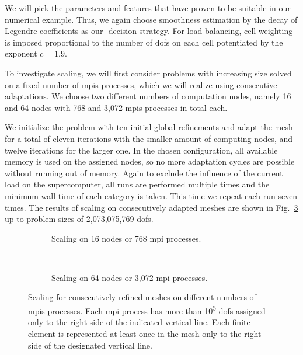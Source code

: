 We will pick the parameters and features that have proven to be suitable in our numerical example. Thus, we again choose smoothness estimation by the decay of Legendre coefficients as our \hp-decision strategy. For load balancing, cell weighting is imposed proportional to the number of \glspl{dof} on each cell potentiated by the exponent $c = 1.9$.



To investigate scaling, we will first consider problems with increasing size solved on a fixed number of \glspl{mpi} processes, which we will realize using consecutive adaptations. We choose two different numbers of computation nodes, namely 16 and 64 nodes with 768 and 3,072 \glspl{mpi} processes in total each.

We initialize the problem with ten initial global refinements and adapt the mesh for a total of eleven iterations with the smaller amount of computing nodes, and twelve iterations for the larger one. In the chosen configuration, all available memory is used on the assigned nodes, so no more adaptation cycles are possible without running out of memory. Again to exclude the influence of the current load on the supercomputer, all runs are performed multiple times and the minimum wall time of each category is taken. This time we repeat each run seven times. The results of scaling on consecutively adapted meshes are shown in Fig.~\ref{fig:size} up to problem sizes of 2,073,075,769 \glspl{dof}.

\begin{figure}
\begin{subfigure}{1\textwidth}
  \centering
  
  \caption{Scaling on 16 nodes or 768 \gls{mpi} processes.}
  \label{fig:size-nodes16}
\end{subfigure} \\
\vspace{1em}
\begin{subfigure}{1\textwidth}
  \centering
  
  \caption{Scaling on 64 nodes or 3,072 \gls{mpi} processes.}
  \label{fig:size-nodes64}
\end{subfigure}
\vspace{-1em}
\caption[Scaling for consecutively refined meshes on different numbers of  processes.]{Scaling for consecutively refined meshes on different numbers of \glspl{mpi} processes. Each \gls{mpi} process has more than 10\textsuperscript{5} \glspl{dof} assigned only to the right side of the indicated vertical line. Each finite element is represented at least once in the mesh only to the right side of the designated vertical line.}
\label{fig:size}
\end{figure}

